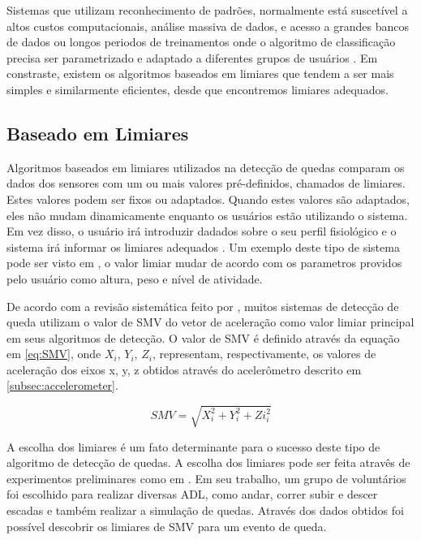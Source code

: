 Sistemas que utilizam reconhecimento de padrões, normalmente está suscetível a altos custos computacionais, análise massiva de dados, e acesso a grandes bancos de dados ou longos periodos de treinamentos onde o algoritmo de classificação precisa ser parametrizado e adaptado a diferentes grupos de usuários \citep{casilari2015analysis}. Em constraste, existem os algoritmos baseados em limiares que tendem a ser mais simples e similarmente eficientes, desde que encontremos limiares adequados. 

\subsection{Baseado em Limiares}
Algoritmos baseados em limiares utilizados na detecção de quedas comparam os dados dos sensores com um ou mais valores pré-definidos, chamados de limiares. Estes valores podem ser fixos ou adaptados. Quando estes valores são adaptados, eles não mudam dinamicamente enquanto os usuários estão utilizando o sistema. Em vez disso, o usuário irá introduzir dadados sobre o seu perfil fisiológico e o sistema irá informar os limiares adequados \citep{habib2014smartphone}. Um exemplo deste tipo de sistema pode ser visto em \cite{sposaro2009ifall}, o valor limiar mudar de acordo com os parametros providos pelo usuário como altura, peso e nível de atividade. 

De acordo com a revisão sistemática feito por \cite{casilari2015analysis}, muitos sistemas de detecção de queda utilizam o valor de \ac{SMV} do vetor de aceleração como  valor limiar principal em seus algoritmos de detecção. O valor de \ac{SMV} é definido através da equação em \ref{eq:SMV}, onde $X_i$, $Y_i$, $Z_i$, representam, respectivamente, os valores de aceleração dos eixos x, y, z obtidos através do acelerômetro descrito em  \ref{subsec:accelerometer}.

\begin{equation}
SMV = \sqrt{X_i^2 + Y_i^2 + Zi_i^2} 
\label{eq:SMV}
\end{equation}

A escolha dos limiares é um fato determinante para o sucesso deste tipo de algoritmo de detecção de quedas. A escolha dos limiares pode ser feita atravês de experimentos preliminares como em \cite{zhang2013honey}. Em seu trabalho, um grupo de voluntários foi escolhido para realizar diversas \ac{ADL}, como andar, correr subir e descer escadas e também realizar a simulação de quedas. Através dos dados obtidos foi possível descobrir os limiares de \ac{SMV} para um evento de queda.  

